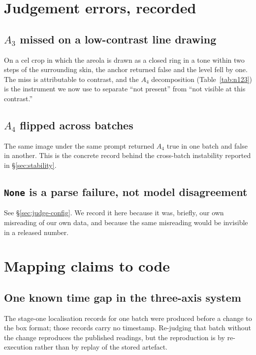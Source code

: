 \section{Judgement errors, recorded}
\label{app:errors}

\subsection{$A_3$ missed on a low-contrast line drawing}

On a cel crop in which the areola is drawn as a closed ring in a tone within
two steps of the surrounding skin, the anchor returned false and the level fell
by one. The miss is attributable to contrast, and the $A_4$ decomposition
(Table~\ref{tab:n123}) is the instrument we now use to separate ``not present''
from ``not visible at this contrast.''

\subsection{$A_4$ flipped across batches}

The same image under the same prompt returned $A_4$ true in one batch and false
in another. This is the concrete record behind the cross-batch instability
reported in \S\ref{sec:stability}.

\subsection{\texttt{None} is a parse failure, not model disagreement}

See \S\ref{sec:judge-config}. We record it here because it was, briefly, our own
misreading of our own data, and because the same misreading would be invisible
in a released number.

\section{Mapping claims to code}
\label{app:code}

\subsection{One known time gap in the three-axis system}

The stage-one localisation records for one batch were produced before a change
to the box format; those records carry no timestamp. Re-judging that batch
without the change reproduces the published readings, but the reproduction is
by re-execution rather than by replay of the stored artefact.

